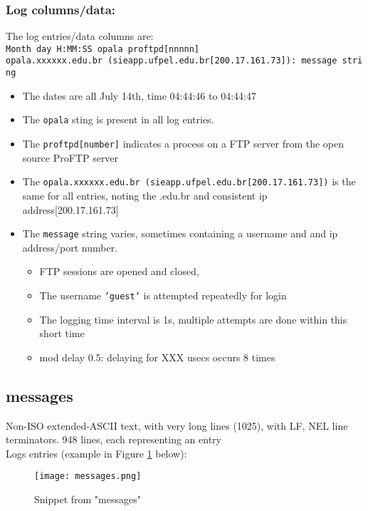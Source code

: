 \documentclass[
	letterpaper, %
	10pt, %
	unnumberedsections, %
	twoside, %
]{APAAssignment}
\begin{document}
\subsubsection{Log columns/data:} The log entries/data columns are: \\
\texttt{Month day H:MM:SS opala proftpd[nnnnn] opala.xxxxxx.edu.br\ (sieapp.ufpel.edu.br[200.17.161.73]):\ message\ string}
\begin{itemize}
  \item The dates are all July 14th, time 04:44:46 to 04:44:47
  \item The \texttt{opala} sting is present in all log entries.
  \item The \texttt{proftpd[number]} indicates a process on a FTP server from the open source ProFTP server 
  \item The \texttt{opala.xxxxxx.edu.br\ (sieapp.ufpel.edu.br[200.17.161.73])} is the same for all entries, noting the .edu.br and consistent ip address{[}200.17.161.73{]}
  \item The \texttt{message} string varies, sometimes containing a username and and ip address/port number.
  \begin{itemize}
	\item FTP sessions are opened and closed, 
	\item The username \texttt{'guest'} is attempted repeatedly for login
	\item The logging time interval is 1s, multiple attempts are done within this short time
	\item mod delay 0.5: delaying for XXX usecs occurs 8 times 
  \end{itemize}
\end{itemize}


\subsection{messages}\label{messages}
Non-ISO extended-ASCII text, with very long lines (1025), with LF, NEL line terminators. 948 lines, each representing an entry \\
Logs entries (example in Figure \ref{fig:messages} below): \\
\begin{figure}[!htp] %
	\centering
	\texttt{[image: messages.png]}
	\caption{Snippet from "messages"}	\label{fig:messages}
\end{figure}
\end{document}
